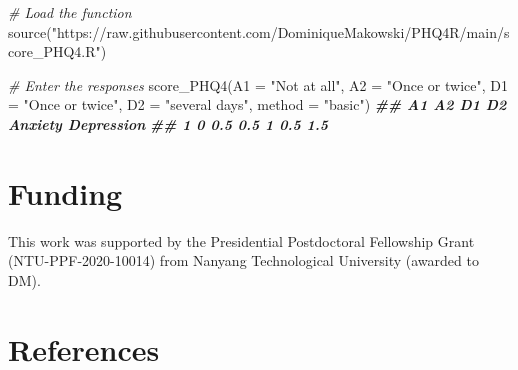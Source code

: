 \documentclass[
  man,floatsintext]{apa6}
\newenvironment{Shaded}{\begin{snugshade}}{\end{snugshade}}
\newcommand{\AttributeTok}[1]{\textcolor[rgb]{0.77,0.63,0.00}{#1}}
\newcommand{\CommentTok}[1]{\textcolor[rgb]{0.56,0.35,0.01}{\textit{#1}}}
\newcommand{\DocumentationTok}[1]{\textcolor[rgb]{0.56,0.35,0.01}{\textbf{\textit{#1}}}}
\newcommand{\FunctionTok}[1]{\textcolor[rgb]{0.00,0.00,0.00}{#1}}
\newcommand{\NormalTok}[1]{#1}
\newcommand{\StringTok}[1]{\textcolor[rgb]{0.31,0.60,0.02}{#1}}
\begin{document}
\begin{Shaded}
\begin{Highlighting}[]
\CommentTok{\# Load the function}
\FunctionTok{source}\NormalTok{(}\StringTok{"https://raw.githubusercontent.com/DominiqueMakowski/PHQ4R/main/score\_PHQ4.R"}\NormalTok{)}

\CommentTok{\# Enter the responses}
\FunctionTok{score\_PHQ4}\NormalTok{(}\AttributeTok{A1 =} \StringTok{"Not at all"}\NormalTok{, }\AttributeTok{A2 =} \StringTok{"Once or twice"}\NormalTok{,}
           \AttributeTok{D1 =} \StringTok{"Once or twice"}\NormalTok{, }\AttributeTok{D2 =} \StringTok{"several days"}\NormalTok{,}
           \AttributeTok{method =} \StringTok{"basic"}\NormalTok{)}
\DocumentationTok{\#\#   A1  A2  D1 D2 Anxiety Depression}
\DocumentationTok{\#\# 1  0 0.5 0.5  1     0.5        1.5}
\end{Highlighting}
\end{Shaded}

\hypertarget{funding}{%
\section{Funding}\label{funding}}

This work was supported by the Presidential Postdoctoral Fellowship Grant (NTU-PPF-2020-10014) from Nanyang Technological University (awarded to DM).

\newpage

\hypertarget{references}{%
\section{References}\label{references}}
\end{document}
